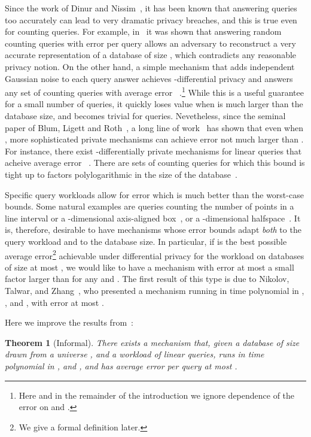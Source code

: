 \documentclass{article}
\newtheorem{theorem}{Theorem}[section]
\begin{document}
Since the work of Dinur and
Nissim~\cite{DN}, it has been known that answering queries too
accurately can lead to very dramatic privacy breaches, and this is
true even for counting queries. For example, in~\cite{DN,DMT07} it was
shown that answering  random counting queries with error
per query  allows an adversary to reconstruct a very
accurate representation of a database of size , which contradicts
any reasonable privacy notion. On the other hand, a simple mechanism
that adds independent Gaussian noise to each query answer achieves
-differential privacy and answers any set  of
counting queries with average error
~\cite{DN,DworkN04,DMNS}.\footnote{Here and in the
  remainder of the introduction we ignore dependence of the error on
   and .} While this is a useful guarantee for a small
number of queries, it quickly loses value when  is much
larger than the database size, and becomes trivial for 
queries. Nevetheless, since the seminal paper of Blum, Ligett and
Roth~\cite{BLR}, a long line of
work~\cite{DworkNRRV09,DworkRV10,RothR10,HardtR10,GuptaHRU11,HardtLM12,GuptaRU11}
has shown that even when , more sophisticated
private mechanisms can achieve error not much larger than
. For instance, there exist -differentially private mechanisms for linear queries that
acheive average error
~\cite{GuptaRU11}. There are sets of
counting queries for which this bound is tight up to factors
polylogarithmic in the size of the database~\cite{BunUV13}.

Specific query workloads allow for error which is much better than the
worst-case bounds. Some natural examples are queries counting the
number of points in a line interval or a -dimensional axis-aligned
box~\cite{dwork-continual,ChanSS10,XiaoWG10}, or a -dimensional
halfspace~\cite{halfspaces}. It is, therefore, desirable to have
mechanisms whose error bounds adapt \emph{both} to the query workload
and to the database size. In particular, if  is the
best possible average error\footnote{We give a formal definition later.}
achievable under differential privacy for the workload  on
databases of size at most , we would like to have a mechanism with
error at most a small factor larger than  for any 
and . The first result of this type is due to Nikolov, Talwar,
and Zhang~\cite{NTZ}, who presented a mechanism running in time
polynomial in , , and , with error at most
.

Here we improve the results from~\cite{NTZ}:
\begin{theorem}[Informal]\label{thm:main}
  There exists a mechanism that, given a database of size  drawn
  from a universe , and a workload  of linear queries,
  runs in time polynomial in ,  and , and has
  average error per query at most .
\end{theorem}
\end{document}
